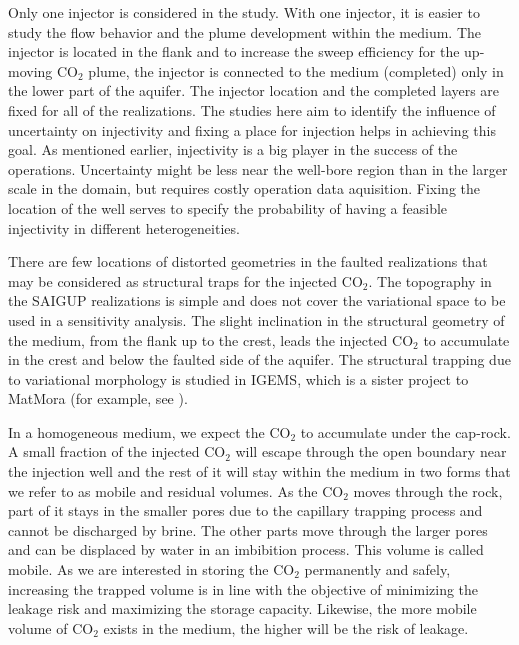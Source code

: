 Only one injector is considered in the study. With one injector, it is easier to
study the flow behavior and the plume development within the medium. The
injector is
located in the flank and to increase the sweep efficiency for the
up-moving $\mbox{CO}_2$ plume, the injector is connected to the medium (completed) only in the lower part
of
the aquifer. The injector location and the completed layers are fixed for all of
the realizations. The studies here aim to identify the influence of uncertainty
on injectivity and fixing a place for injection helps in achieving this goal. As mentioned earlier, injectivity is a big player in the success of the operations. Uncertainty might be less near the well-bore region than in the larger scale in the domain, but requires costly operation data aquisition. Fixing the location of the well serves to specify the probability of having a feasible injectivity in different heterogeneities.

There are few locations of distorted geometries in the faulted realizations that
may be considered as structural traps for the injected $\mbox{CO}_2$. The
topography in the SAIGUP realizations is simple and does not cover the
variational space to be used in a sensitivity analysis. The slight inclination
in the structural geometry of the medium, from the flank up to the crest, leads
the injected $\mbox{CO}_2$  to accumulate in the crest and below the faulted
side of the aquifer. The structural trapping due to variational morphology is
studied in IGEMS, which is a sister project to MatMora (for example, see
\cite{syversveenstudy}). 

In a homogeneous medium, we expect the $\mbox{CO}_2$ to accumulate under the
cap-rock. A small fraction of the injected $\mbox{CO}_2$ will escape through the
open boundary near the injection well and the rest of it will stay within the
medium in two forms that we refer to as  mobile and residual volumes. As
the $\mbox{CO}_2$ moves through the rock, part of it stays in the smaller pores
due to the capillary trapping process and cannot be discharged by brine. The other
parts move through the larger pores and can be displaced by water in an
imbibition process. This volume is called mobile. As we are interested in
storing the $\mbox{CO}_2$ permanently and safely, increasing the trapped volume
is in line with the objective of minimizing the leakage risk and maximizing the
storage capacity. Likewise, the more mobile volume of $\mbox{CO}_2$ exists in
the medium, the higher will be the risk of leakage. 

